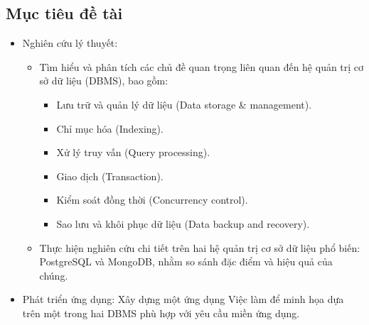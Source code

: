 \subsection{Mục tiêu đề tài}
\begin{itemize}
    \item Nghiên cứu lý thuyết:
        \begin{itemize}
            \item Tìm hiểu và phân tích các chủ đề quan trọng liên quan đến hệ quản trị cơ sở dữ liệu (DBMS), bao gồm:
                \begin{itemize}
                    \item Lưu trữ và quản lý dữ liệu (Data storage \& management).
                    \item Chỉ mục hóa (Indexing).
                    \item Xử lý truy vấn (Query processing).
                    \item Giao dịch (Transaction).
                    \item Kiểm soát đồng thời (Concurrency control).
                    \item Sao lưu và khôi phục dữ liệu (Data backup and recovery).
                \end{itemize}
            \item Thực hiện nghiên cứu chi tiết trên hai hệ quản trị cơ sở dữ liệu phổ biến: PostgreSQL và MongoDB, nhằm so sánh đặc điểm và hiệu quả của chúng.
        \end{itemize}
    \item Phát triển ứng dụng: Xây dựng một ứng dụng Việc làm để minh họa dựa trên một trong hai DBMS phù hợp với yêu cầu miền ứng dụng.
\end{itemize}
